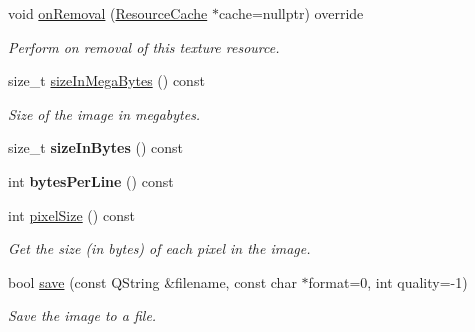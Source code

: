 \begin{Indent}
\begin{DoxyCompactItemize}
\mbox{\label{classrev_1_1_image_acdd5536fcfa40e25af05c7834ad6d274}} 
void \mbox{\hyperlink{classrev_1_1_image_acdd5536fcfa40e25af05c7834ad6d274}{on\+Removal}} (\mbox{\hyperlink{classrev_1_1_resource_cache}{Resource\+Cache}} $\ast$cache=nullptr) override
\begin{DoxyCompactList}\small\item\em Perform on removal of this texture resource. \end{DoxyCompactList}\item 
\mbox{\label{classrev_1_1_image_a56adf168d25ea86be91e23f529f25a3c}} 
size\+\_\+t \mbox{\hyperlink{classrev_1_1_image_a56adf168d25ea86be91e23f529f25a3c}{size\+In\+Mega\+Bytes}} () const
\begin{DoxyCompactList}\small\item\em Size of the image in megabytes. \end{DoxyCompactList}\item 
\mbox{\label{classrev_1_1_image_a72a64ed07207d0eaace235011953a2f6}} 
size\+\_\+t {\bfseries size\+In\+Bytes} () const
\item 
\mbox{\label{classrev_1_1_image_adb7895716b3ef9363d0be9cefbadf059}} 
int {\bfseries bytes\+Per\+Line} () const
\item 
\mbox{\label{classrev_1_1_image_abcfedf165ff7295ce9f2ba61a612f7f5}} 
int \mbox{\hyperlink{classrev_1_1_image_abcfedf165ff7295ce9f2ba61a612f7f5}{pixel\+Size}} () const
\begin{DoxyCompactList}\small\item\em Get the size (in bytes) of each pixel in the image. \end{DoxyCompactList}\item 
\mbox{\label{classrev_1_1_image_aebca2923a28065a849f6368fa722692c}} 
bool \mbox{\hyperlink{classrev_1_1_image_aebca2923a28065a849f6368fa722692c}{save}} (const Q\+String \&filename, const char $\ast$format=0, int quality=-\/1)
\begin{DoxyCompactList}\small\item\em Save the image to a file. \end{DoxyCompactList}\end{DoxyCompactItemize}
\end{Indent}
